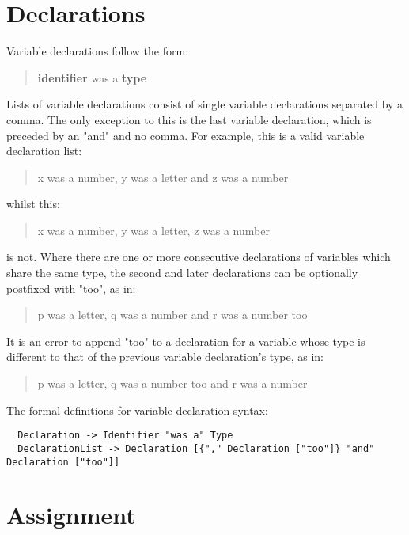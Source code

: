\documentclass[a4wide, 11pt]{article}
\begin{document}
\section{Declarations}

Variable declarations follow the form:

\begin{quote}
\textbf{identifier} was a \textbf{type}
\end{quote}

Lists of variable declarations consist of single variable declarations separated by a comma. The only exception to this is the last variable declaration, which is preceded by an "and" and no comma. For example, this is a valid variable declaration list:

\begin{quote}
x was a number, y was a letter and z was a number
\end{quote}

whilst this:

\begin{quote}
x was a number, y was a letter, z was a number
\end{quote}

is not. Where there are one or more consecutive declarations of variables which share the same type, the second and later declarations can be optionally postfixed with "too", as in:

\begin{quote}
p was a letter, q was a number and r was a number too
\end{quote}

It is an error to append "too" to a declaration for a variable whose type is different to that of the previous variable declaration's type, as in:

\begin{quote}
p was a letter, q was a number too and r was a number
\end{quote}

The formal definitions for variable declaration syntax:

\begin{verbatim}
  Declaration -> Identifier "was a" Type
  DeclarationList -> Declaration [{"," Declaration ["too"]} "and" Declaration ["too"]]
\end{verbatim}

\section{Assignment}
\end{document}
